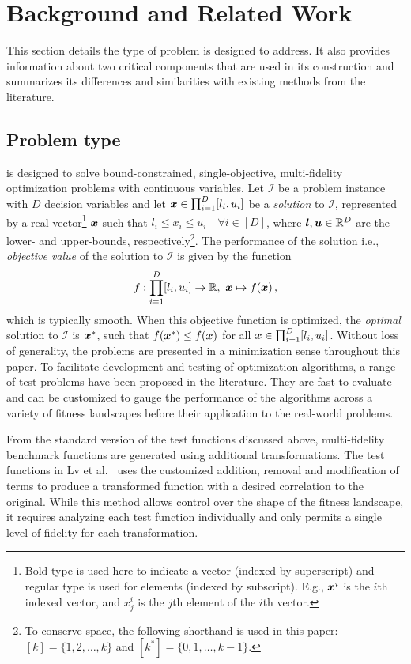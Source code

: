 \section{Background and Related Work}\label{sec:back}
This section details the type of problem \AlgName{} is designed to address. It also provides information about two critical components that are used in its construction and summarizes its differences and similarities with existing methods from the literature.

\subsection{Problem type}
\AlgName{} is designed to solve bound-constrained, single-objective, multi-fidelity optimization problems with continuous variables. Let $\mathcal{I}$ be a problem instance with $D$ decision variables and let $\boldsymbol{x} \in \prod^D_{i=1}[l_i,u_i]$ be a \emph{solution} to $\mathcal{I}$, represented by a real vector\footnote{Bold type is used here to indicate a vector (indexed by superscript) and regular type is used for elements (indexed by subscript). E.g., $\boldsymbol{x}^i$ is the $i$th indexed vector, and $x_j^i$ is the $j$th element of the $i$th vector.} $\boldsymbol{x}$ such that $l_i \le x_i \le u_i \quad \forall {i \in [D]}$, where $\boldsymbol{l},\boldsymbol{u} \in \mathbb{R}^D$ are the lower- and upper-bounds, respectively\footnote{To conserve space, the following shorthand is used in this paper: ${[k] = \{1,2,\dots,k\}}$ and $[k^*] = \{0,1,\dots,k-1\}$.}. The performance of the solution i.e., \emph{objective value} of the solution to $\mathcal{I}$ is given by the function
\begin{equation}
f:\displaystyle\prod^D_{i=1}[l_i,u_i]\to \mathbb{R},\ \boldsymbol{x} \mapsto f(\boldsymbol{x})\,, \label{eq:objective}
\end{equation}
which is typically smooth. When this objective function is optimized, the \emph{optimal} solution to $\mathcal{I}$ is $\boldsymbol{x}^*$, such that $f(\boldsymbol{x}^*) \leq f(\boldsymbol{x})$ for all $\boldsymbol{x} \in \prod^D_{i=1}[l_i,u_i]$. Without loss of generality, the problems are presented in a minimization sense throughout this paper. 
To facilitate development and testing of optimization algorithms, a range of test problems have been proposed in the literature. They are fast to evaluate and can be customized to gauge the performance of the algorithms across a variety of fitness landscapes before their application to the real-world problems.

From the standard version of the test functions discussed above, multi-fidelity benchmark functions are generated using additional transformations. The test functions in Lv et al.~\cite{lv2021multi} uses the customized addition, removal and modification of terms to produce a transformed function with a desired correlation to the original. While this method allows control over the shape of the fitness landscape, it requires analyzing each test function individually and only permits a single level of fidelity for each transformation.

